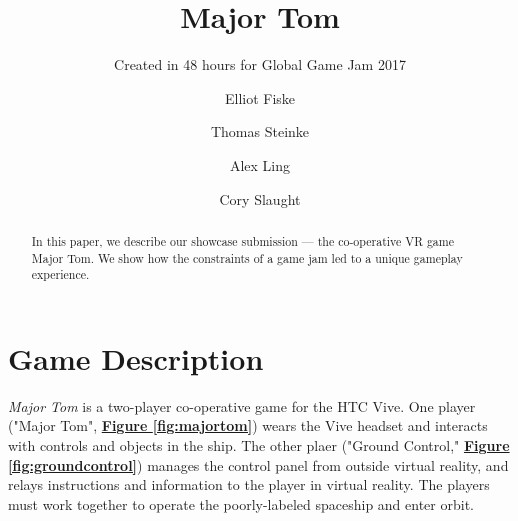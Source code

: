 \documentclass[sigconf]{acmart}
\begin{document}
	
\title{Major Tom}
\subtitle{Created in 48 hours for Global Game Jam 2017}

\author{Elliot Fiske}

\author{Thomas Steinke}

\author{Alex Ling}

\author{Cory Slaught}

\begin{abstract}
In this paper, we describe our showcase submission --- the co-operative VR game Major Tom. We show how the constraints of a game jam led to a unique gameplay experience.
\end{abstract}




\maketitle

\section{Game Description}

\textit{Major Tom} is a two-player co-operative game for the HTC Vive. One player ("Major Tom", \textbf{\hyperref[fig:majortom]{Figure \ref*{fig:majortom}}}) wears the Vive headset and interacts with controls and objects in the ship. The other plaer ("Ground Control," \textbf{\hyperref[fig:groundcontrol]{Figure \ref*{fig:groundcontrol}}}) manages the control panel from outside virtual reality, and relays instructions and information to the player in virtual reality. The players must work together to operate the poorly-labeled spaceship and enter orbit.
\end{document}
